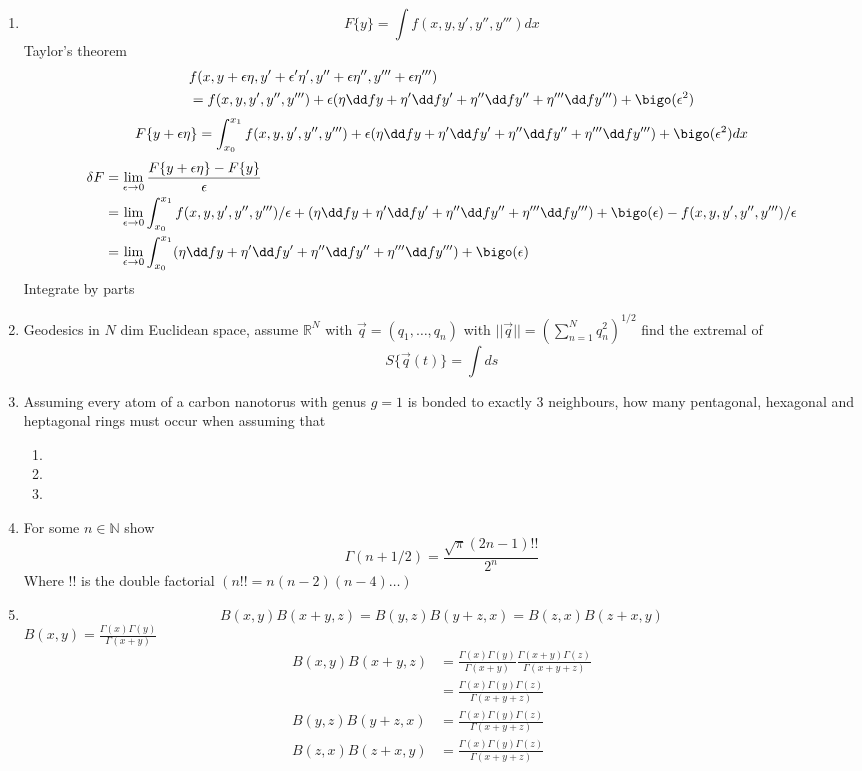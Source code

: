 \documentclass{E:/Documents/Latex/myassignment}
\begin{document}
\begin{enumerate}
	\item 
	\[F\{y\} = \int f(x,y,y',y'',y''') dx\]
	Taylor's theorem
	\begin{align*}
		&f(x,y+\epsilon \eta, y' + \epsilon'\eta', y'' + \epsilon\eta '', y'''+ \epsilon\eta''')\\
		&= f(x,y,y',y'',y''') + \epsilon(\eta \dd fy + \eta' \dd f{y'} + \eta'' \dd f{y''} + \eta''' \dd f{y'''}) + \bigo(\epsilon^2)
	\end{align*}
	\[F\{y+\epsilon\eta\} = \int_{x_0}^{x_1} f(x,y,y',y'',y''') + \epsilon(\eta \dd fy + \eta' \dd f{y'} + \eta'' \dd f{y''} + \eta''' \dd f{y'''}) + \bigo(\epsilon^2) dx\]
	\begin{align*}
		\delta F &= \lim_{\epsilon \to 0} \frac{F\{y + \epsilon \eta\} - F\{y\}}{\epsilon}\\
		&=\lim_{\epsilon \to 0} \int_{x_0}^{x_1} f(x,y,y',y'',y''')/\epsilon + (\eta \dd fy + \eta' \dd f{y'} + \eta'' \dd f{y''} + \eta''' \dd f{y'''}) + \bigo(\epsilon) - f(x,y,y',y'',y''')/\epsilon\\
		&=\lim_{\epsilon \to 0} \int_{x_0}^{x_1}  (\eta \dd fy + \eta' \dd f{y'} + \eta'' \dd f{y''} + \eta''' \dd f{y'''}) + \bigo(\epsilon)\\
	\end{align*}
	Integrate by parts
	\item Geodesics in $N$ dim Euclidean space, assume $\mathbb{R}^N$ with $\vec q= (q_1,\ldots,q_n)$ with $||\vec q|| = \left(\sum_{n=1}^N q_n^2\right)^{1/2}$ find the extremal of
	\[S\{\vec q(t)\} = \int ds\]
	\item Assuming every atom of a carbon nanotorus with genus $g=1$ is bonded to exactly 3 neighbours, how many pentagonal, hexagonal and heptagonal rings must occur when assuming that
	\begin{enumerate}
		\item 
		\item 
		\item 
	\end{enumerate}
	\item For some $n\in \mathbb{N}$ show
	\[\Gamma(n+1/2) = \frac{\sqrt{\pi} (2n-1)!!}{2^n}\]
	Where $!!$ is the double factorial $(n!! = n(n-2)(n-4)\ldots)$
	\item 
	\[B(x,y)B(x+y,z) = B(y,z) B(y+z,x) = B(z,x) B(z+x,y)\]
	$B(x,y) = \frac{\Gamma(x) \Gamma(y)}{\Gamma(x+y)}$
	\begin{align*}
		B(x,y)B(x+y,z) &= \frac{\Gamma(x) \Gamma(y)}{\Gamma(x+y)} \frac{\Gamma(x+y) \Gamma(z)}{\Gamma(x+y+z)}\\
		&= \frac{\Gamma(x) \Gamma(y)\Gamma(z)}{\Gamma(x+y+z)}\\
		B(y,z) B(y+z,x) &= \frac{\Gamma(x) \Gamma(y)\Gamma(z)}{\Gamma(x+y+z)}\\
		B(z,x) B(z+x,y) &= \frac{\Gamma(x) \Gamma(y)\Gamma(z)}{\Gamma(x+y+z)}\\
	\end{align*}


\end{enumerate}
\end{document}
